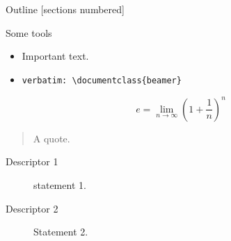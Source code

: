 \documentclass{lib/SMbeamer}
\begin{document}
\maketitle


\begin{frame}{Outline}   %
  [sections numbered]
  \tableofcontents[hideallsubsections]
\end{frame}



\begin{frame}[fragile]{Some tools}  %
  \begin{itemize}
    \item \alert{Important text.}
    \item \begin{verbatim}verbatim: \documentclass{beamer} \end{verbatim}
  \end{itemize}
  \[
    e = \lim_{n\to \infty} {\left(1 + \frac{1}{n}\right)}^n
  \]
  \begin{quote}
    A quote.
  \end{quote}
  \begin{description}
    \item[Descriptor 1] statement 1. 
    \item[Descriptor 2] Statement 2.
  \end{description}
\end{frame}
\end{document}

